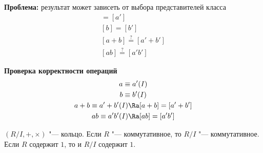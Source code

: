 \textbf{Проблема:}
результат может зависеть от выбора представителей класса
\begin{gather*}
	[a] = [a'] \\
	[b] = [b'] \\
	[a + b] \overset{?}{=} [a' + b'] \\
	[ab] \overset{?}{=} [a'b']
\end{gather*}
	
\textbf{Проверка корректности операций}
\begin{gather*}
	a \equiv a' (I) \\
	b \equiv b' (I) \\
	a + b \equiv a' + b' (I) \Ra [a + b] = [a' + b'] \\
	ab \equiv a'b' (I) \Ra [ab] = [a'b'] \\
\end{gather*}

\begin{theorem}
	$(R/I, +, \times)$ "--- кольцо.
	Если $R$ "--- коммутативное, то $R/I$ "--- коммутативное.
	Если $R$ содержит $1$,  то и $R/I$ содержит $1$.
\end{theorem}

